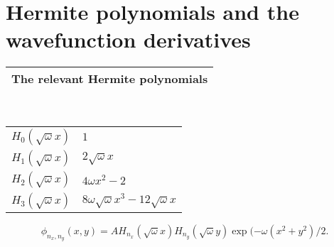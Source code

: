 \section{Hermite polynomials and the wavefunction derivatives}\label{app:hermite_and_derivatives}

\begin{table}[H]
\center
\begin{tabular}{l}
The relevant Hermite polynomials \\ \hline
\end{tabular}\\
\begin{tabular}{l|l}
$H_0(\sqrt{\omega}x)$ & $1$ \\
$H_1(\sqrt{\omega}x)$ & $2\sqrt{\omega}x$ \\
$H_2(\sqrt{\omega}x)$ & $4\omega x^2 -2 $ \\
$H_3(\sqrt{\omega}x)$ & $8\omega\sqrt{\omega}x^3 - 12\sqrt{\omega}x $ \\
\end{tabular}
\end{table}

\begin{equation*}
\phi_{n_x,n_y}(x,y) = A H_{n_x}(\sqrt{\omega}x)H_{n_y}(\sqrt{\omega}y)\exp{(-\omega(x^2+y^2)/2}.
\end{equation*}

